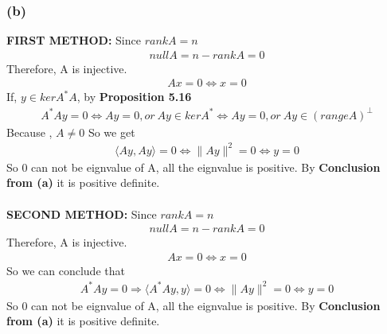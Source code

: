 \documentclass{article}
\begin{document}
\subsubsection*{(b)}
\textbf{FIRST METHOD:}
Since $rankA = n$
\begin{equation*}
    \begin{split}
        nullA = n - rankA = 0
    \end{split}
\end{equation*}
Therefore, A is injective. 
\begin{equation*}
    \begin{split}
        Ax = 0 \iff x = 0
    \end{split}
\end{equation*}
If, $y \in kerA^*A$, by \textbf{Proposition 5.16}
\begin{equation*}
    \begin{split}
        A^*Ay = 0 \iff Ay = 0, or \  Ay \in kerA^* \iff Ay = 0, or \  Ay \in (rangeA)^{\bot}
    \end{split}
\end{equation*}
Because , $A \ne 0$ So we get\begin{equation*}
    \begin{split}
        \langle Ay, Ay \rangle = 0 \iff \|Ay\|^2 = 0 \iff y = 0
    \end{split}
\end{equation*}
So $0$ can not be eignvalue of A,  all the eignvalue is positive. By \textbf{Conclusion from (a)} it is positive definite. \\ \\ 

\textbf{SECOND METHOD:}
Since $rankA = n$
\begin{equation*}
    \begin{split}
        nullA = n - rankA = 0
    \end{split}
\end{equation*}
Therefore, A is injective. 
\begin{equation*}
    \begin{split}
        Ax = 0 \iff x = 0
    \end{split}
\end{equation*}
So we can conclude that \begin{equation*}
    \begin{split}
        A^*Ay = 0 \Rightarrow \langle A^*Ay, y \rangle = 0 \iff \|Ay\|^2 = 0 \iff y = 0
    \end{split}
\end{equation*}
So $0$ can not be eignvalue of A,  all the eignvalue is positive. By \textbf{Conclusion from (a)} it is positive definite. 
\end{document}
